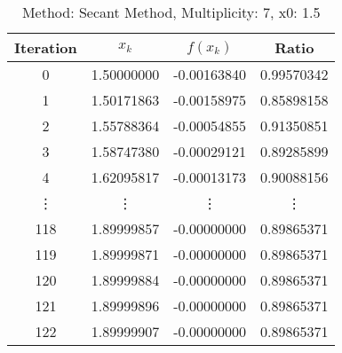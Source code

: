 \begin{table}
\centering
\caption{Method: Secant Method, Multiplicity: 7, x0: 1.5}
\label{tab:table_Secant_Method_7_1_5}
\begin{tabular}{c c c c}
\toprule
Iteration &      $x_k$ &    $f(x_k)$ &      Ratio \\
\midrule
        0 & 1.50000000 & -0.00163840 & 0.99570342 \\
        1 & 1.50171863 & -0.00158975 & 0.85898158 \\
        2 & 1.55788364 & -0.00054855 & 0.91350851 \\
        3 & 1.58747380 & -0.00029121 & 0.89285899 \\
        4 & 1.62095817 & -0.00013173 & 0.90088156 \\
   \vdots &     \vdots &      \vdots &     \vdots \\
      118 & 1.89999857 & -0.00000000 & 0.89865371 \\
      119 & 1.89999871 & -0.00000000 & 0.89865371 \\
      120 & 1.89999884 & -0.00000000 & 0.89865371 \\
      121 & 1.89999896 & -0.00000000 & 0.89865371 \\
      122 & 1.89999907 & -0.00000000 & 0.89865371 \\
\bottomrule
\end{tabular}
\end{table}
